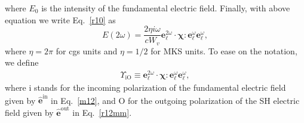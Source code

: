 \documentclass[10pt]{book}
\begin{document}
where $E_0$ is the intensity of the fundamental electric field.
Finally, with above equation we write Eq.~\eqref{r10} as
\begin{equation}\label{mr10}
E(2\omega) 
= \frac{2\eta i \omega}{cW_v}
\mathbf{e}^{2\omega}_{\ell}\cdot\boldsymbol{\chi}:\mathbf{e}^{\omega}_{\ell}
\mathbf{e}^{\omega}_{\ell}
,
\end{equation}
where $\eta=2\pi$ for cgs units and $\eta=1/2$ for MKS units.
To ease on the notation, we define
\begin{align}\label{mc0}
\Upsilon_{\mathrm{iO}}
\equiv 
\mathbf{e}^{2\omega}_{\ell}\cdot\boldsymbol{\chi}:\mathbf{e}^{\omega}_{\ell}
\mathbf{e}^{\omega}_{\ell}
,
\end{align}
where i stands for the incoming polarization of the fundamental
electric field given by $\hat{\mathbf{e}}^{\mathrm{in}}$ in Eq.~\eqref{m12},
and O for the outgoing polarization of the SH electric field
given by $\hat{\mathbf{e}}^{\mathrm{out}}$ in Eq.~\eqref{r12mm}.
\end{document}
